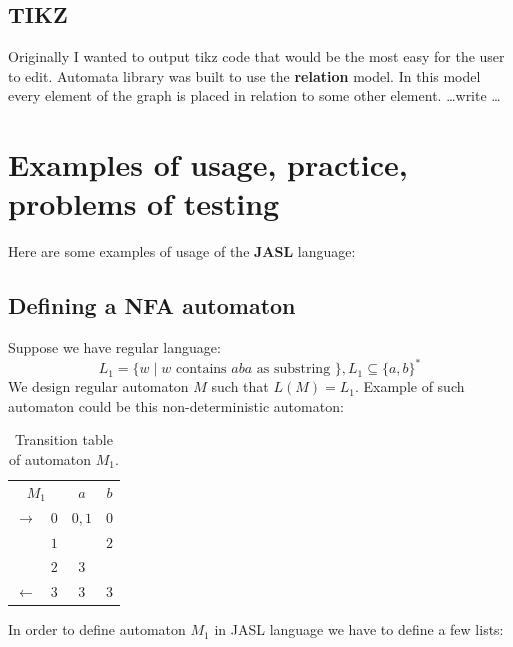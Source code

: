 \documentclass{ctuthesis}
\begin{document}
\section{TIKZ}
Originally I wanted to output tikz code that would be the most easy for the user to edit. Automata library was built to use the \textbf{relation} model. In this model every element of the graph is placed in relation to some other element. \ldots write \ldots


\chapter{Examples of usage, practice, problems of testing}
Here are some examples of usage of the \textbf{JASL} language: 

\section{Defining a NFA automaton}
\label{sec:example_NFA}
Suppose we have regular language: 
\begin{equation*}
L_1 = \{w \mid w \text{ contains } aba \text{ as substring }\}, L_1 \subseteq \{a, b\}^*
\end{equation*} 
We design regular automaton $M$ such that $L(M) = L_1$. Example of such automaton could be this non-deterministic automaton:
\begin{table}[H]
\begin{ctucolortab}
\begin{tabular}{cc|cc}
\multicolumn{2}{c}{\bfseries $M_1$} & \bfseries $a$ & \bfseries $b$ \\\Midrule
$\rightarrow$ 	& $0$ & $0,1$ 	& $0$  \\
				& $1$ &  	& $2$  \\
				& $2$ & $3$		&  \\
$\leftarrow$	& $3$ & $3$		& $3$ 
\end{tabular}
\end{ctucolortab}
\caption{Transition table of automaton $M_1$.}
\label{fig:examples_NFA_table}
\end{table} 

In order to define automaton $M_1$ in JASL language we have to define a few lists: 
\end{document}
